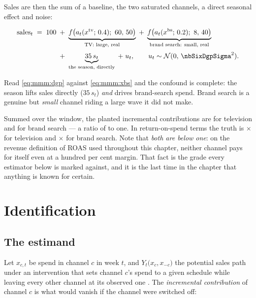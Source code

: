 Sales are then the sum of a baseline, the two saturated channels, a direct seasonal effect and
noise:

\begin{equation}
  \begin{aligned}
    \text{sales}_t \;=\; 100
      &\;+\; \underbrace{f\big(a_t(x^{\text{tv}};\, 0.4);\ 60,\, 50\big)}_{\text{TV: large, real}}
       \;+\; \underbrace{f\big(a_t(x^{\text{bs}};\, 0.2);\ 8,\, 40\big)}_{\text{brand search: small, real}} \\[2pt]
      &\;+\; \underbrace{35\, s_t}_{\text{the season, directly}}
       \;+\; u_t,
      \qquad u_t \sim \mathcal N(0,\, \nbSixDgpSigma^2).
  \end{aligned}
  \label{eq:mmm:dgp}
\end{equation}

Read \cref{eq:mmm:dgp} against \cref{eq:mmm:xbs} and the confound is complete: the season lifts
sales directly ($35\,s_t$) \emph{and} drives brand-search spend. Brand search is a genuine but
\emph{small} channel riding a large wave it did not make.

Summed over the window, the planted incremental contributions are \eur{\nbSixTrueTv} for
television and \eur{\nbSixTrueBs} for brand search --- a ratio of \nbSixTrueRatio{} to one. In
return-on-spend terms the truth is \nbSixTrueRoasTv$\times$ for television and
\nbSixTrueRoasBs$\times$ for brand search. Note that \emph{both are below one}: on the revenue
definition of ROAS used throughout this chapter, neither channel pays for itself even at a
hundred per cent margin. That fact is the grade every estimator below is marked against, and it is
the last time in the chapter that anything is known for certain.




\section{Identification}
\label{sec:mmm:ident}

\subsection*{The estimand}

Let $x_{c,t}$ be spend in channel $c$ in week $t$, and $Y_t\big(x_{c}, x_{-c}\big)$ the potential
sales path under an intervention that sets channel $c$'s spend to a given schedule while leaving
every other channel at its observed one \citep{rubin1974, pearl2009}. The \emph{incremental
contribution} of channel $c$ is what would vanish if the channel were switched off:

